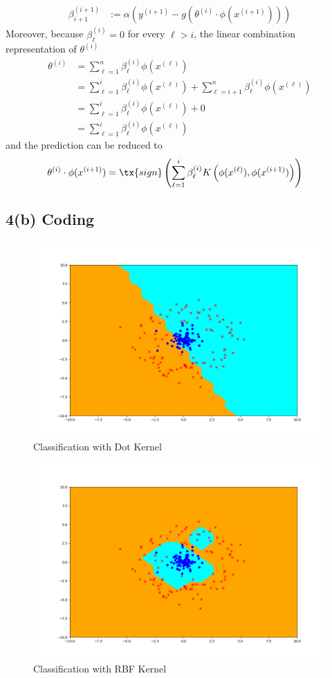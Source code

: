 \documentclass[11pt]{article}
\newcommand{\upi}[0]{^{(i)}}
\begin{document}
	\begin{align}
		\beta_{i+1}^{(i+1)} &:= \alpha \left(y^{(i+1)} - g(\theta\upi \cdot \phi(x^{(i+1)}) )\right)
	\end{align}
	Moreover, because $\beta_\ell\upi = 0$ for every  $\ell > i$, the linear combination representation of $\theta\upi$ 
	\begin{align}
		\theta\upi &= \sum_{\ell=1}^n \beta_\ell\upi \phi(x^{(\ell)}) \\
		&= \sum_{\ell=1}^i \beta_\ell\upi \phi(x^{(\ell)}) + \sum_{\ell=i+1}^n \beta_\ell\upi \phi(x^{(\ell)}) \\
		&= \sum_{\ell=1}^i \beta_\ell\upi \phi(x^{(\ell)}) + 0 \\
		&= \sum_{\ell=1}^i \beta_\ell\upi \phi(x^{(\ell)})
	\end{align}
	and the prediction can be reduced to
	\begin{align}
		\theta\upi \cdot \phi(x^{(i+1)}) &= \tx{sign}\left(
		\sum_{\ell=1}^i \beta_\ell\upi K \left(\phi(x^{(\ell)}),\phi(x^{(i+1)}) \right)
		\right)
	\end{align}
	
	\newpage
	\subsection{4(b) Coding}
	\begin{figure}[h]
		\centering
		\includegraphics[width=0.6\linewidth]{src/perceptron/perceptron_dot_output.png}
		\caption{Classification with Dot Kernel}
	\end{figure}
	
	\begin{figure}[h]
		\centering
		\includegraphics[width=0.6\linewidth]{src/perceptron/perceptron_rbf_output.png}
		\caption{Classification with RBF Kernel}
	\end{figure}
	
\end{document}
